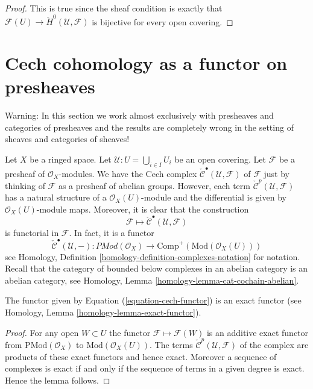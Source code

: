 \begin{proof}
This is true since the sheaf condition is exactly that
$\mathcal{F}(U) \to \check{H}^0(\mathcal{U}, \mathcal{F})$
is bijective for every open covering.
\end{proof}






\section{Cech cohomology as a functor on presheaves}
\label{section-cech-functor}

\noindent
Warning: In this section we work almost exclusively with presheaves and
categories of presheaves and the results are completely wrong in the
setting of sheaves and categories of sheaves!

\medskip\noindent
Let $X$ be a ringed space.
Let $\mathcal{U} : U = \bigcup_{i \in I} U_i$ be an open covering.
Let $\mathcal{F}$ be a presheaf of $\mathcal{O}_X$-modules.
We have the Cech complex
$\check{\mathcal{C}}^\bullet(\mathcal{U}, \mathcal{F})$
of $\mathcal{F}$ just by thinking of $\mathcal{F}$
as a presheaf of abelian groups. However, each term
$\check{\mathcal{C}}^p(\mathcal{U}, \mathcal{F})$ has a natural
structure of a $\mathcal{O}_X(U)$-module and the differential is given by
$\mathcal{O}_X(U)$-module maps. Moreover, it is clear that the
construction
$$
\mathcal{F} \longmapsto \check{\mathcal{C}}^\bullet(\mathcal{U}, \mathcal{F})
$$
is functorial in $\mathcal{F}$. In fact, it is a functor
\begin{equation}
\label{equation-cech-functor}
\check{\mathcal{C}}^\bullet(\mathcal{U}, -) :
\textit{PMod}(\mathcal{O}_X)
\longrightarrow
\text{Comp}^{+}(\text{Mod}(\mathcal{O}_X(U)))
\end{equation}
see Homology, Definition \ref{homology-definition-complexes-notation}
for notation. Recall that the category of bounded below complexes
in an abelian category is an abelian category, see
Homology, Lemma \ref{homology-lemma-cat-cochain-abelian}.

\begin{lemma}
\label{lemma-cech-exact-presheaves}
The functor given by Equation (\ref{equation-cech-functor})
is an exact functor (see Homology, Lemma \ref{homology-lemma-exact-functor}).
\end{lemma}

\begin{proof}
For any open $W \subset U$ the functor
$\mathcal{F} \mapsto \mathcal{F}(W)$ is an additive exact functor
from $\text{PMod}(\mathcal{O}_X)$ to $\text{Mod}(\mathcal{O}_X(U))$.
The terms
$\check{\mathcal{C}}^p(\mathcal{U}, \mathcal{F})$
of the complex are products of these exact functors and hence exact.
Moreover a sequence of complexes is exact if and only if the sequence
of terms in a given degree is exact. Hence the lemma follows.
\end{proof}

